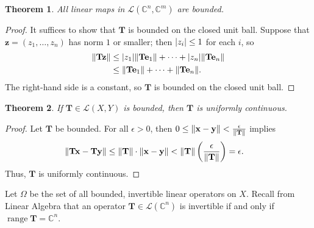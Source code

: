 \documentclass[11pt]{article}
\renewcommand{\vec}[1]{\mathbf{#1}}
\newcommand{\mat}[1]{\mathbf{#1}}
\newcommand{\range}{\operatorname{range}}
\newtheorem{theorem}{Theorem}
\begin{document}
\begin{theorem}
  All linear maps in $\mathcal{L}(\mathbb{C}^{n}, \mathbb{C}^{m})$ are bounded.
\end{theorem}  
\begin{adjustwidth}{0.5cm}{}
  \begin{proof}
    It suffices to show that $\mat{T}$ is bounded on the closed unit ball. Suppose that $\vec{z} = (z_{1}, \ldots, z_{n})$ has norm $1$ or smaller; then $\abs{z_{i}} \le 1$ for each $i$, so
		\begin{align*}
      \norm{\mat{T} \vec{z}} &\le \abs{z_{1}} \norm{\mat{T} \vec{e}_{1}} + \cdots + \abs{z_{n}} \norm{\mat{T} \vec{e}_{n}} \\
			&\le \norm{\mat{T} \vec{e}_{1}} + \cdots + \norm{\mat{T} \vec{e}_{n}}.
		\end{align*}
    The right-hand side is a constant, so $\mat{T}$ is bounded on the closed unit ball.
  \end{proof}
\end{adjustwidth}

\begin{theorem}
	If $\mat{T} \in \mathcal{L}(X, Y)$ is bounded, then $\mat{T}$ is uniformly continuous.
\end{theorem}
\begin{adjustwidth}{0.5cm}{}
    \begin{proof}
		Let $\mat{T}$ be bounded. For all $\epsilon > 0$, then $0 \le \norm{\vec{x} - \vec{y}} < \tfrac{\epsilon}{\norm{\mat{T}}}$ implies
		\begin{align*}
			\norm{\mat{T} \vec{x} - \mat{T} \vec{y}} &\le \norm{\mat{T}} \cdot \norm{\vec{x} - \vec{y}} < \norm{\mat{T}} \left( \frac{\epsilon}{\norm{\mat{T}}} \right) = \epsilon.
		\end{align*}
		Thus, $\mat{T}$ is uniformly continuous.
	\end{proof}
\end{adjustwidth}

Let $\Omega$ be the set of all bounded, invertible linear operators on $X$. Recall from Linear Algebra that an operator $\mat{T} \in \mathcal{L}(\mathbb{C}^{n})$ is invertible if and only if $\range \mat{T} = \mathbb{C}^{n}$.
\end{document}
